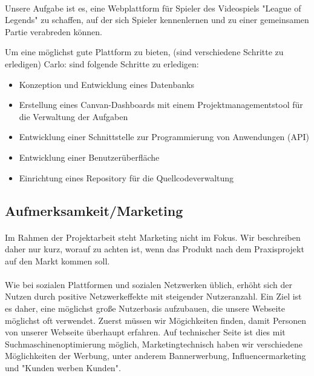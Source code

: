\paragraph{}
Unsere Aufgabe ist es, eine Webplattform für Spieler des Videospiels "League of Legends" zu schaffen, auf der sich Spieler kennenlernen und zu einer gemeinsamen Partie verabreden können. 

Um eine möglichst gute Plattform zu bieten, (sind verschiedene Schritte zu erledigen) Carlo: sind folgende Schritte zu erledigen:
\begin{itemize}
    \item Konzeption und Entwicklung eines Datenbanks
    \item Erstellung eines Canvan-Dashboards mit einem Projektmanagementstool für die Verwaltung der Aufgaben
    \item Entwicklung einer Schnittstelle zur Programmierung von Anwendungen (API)
    \item Entwicklung einer Benutzerüberfläche
    \item Einrichtung eines Repository für die Quellcodeverwaltung 
  \end{itemize}
\subsection{Aufmerksamkeit/Marketing}
\paragraph{}
Im Rahmen der Projektarbeit steht Marketing nicht im Fokus. Wir beschreiben daher nur kurz, worauf zu achten ist, wenn das Produkt nach dem Praxisprojekt auf den Markt kommen soll.

\paragraph{}
Wie bei sozialen Plattformen und sozialen Netzwerken üblich, erhöht sich der Nutzen durch positive Netzwerkeffekte mit steigender Nutzeranzahl. Ein Ziel ist es daher, eine möglichst große Nutzerbasis aufzubauen, die unsere Webseite möglichst oft verwendet.
Zuerst müssen wir Mögichkeiten finden, damit Personen von unserer Webseite überhaupt erfahren. Auf technischer Seite ist dies mit Suchmaschinenoptimierung möglich, Marketingtechnisch haben wir verschiedene Möglichkeiten der Werbung, unter anderem Bannerwerbung, Influencermarketing und "Kunden werben Kunden".

